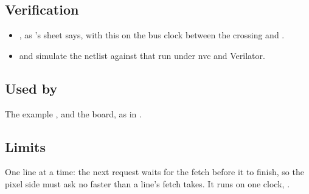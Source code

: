 \subsection*{Verification}

\begin{itemize}
\item {}, as 's sheet says, with this
on the bus clock between the crossing and .
\item {} and
 simulate the netlist
against that run under nvc and Verilator.
\end{itemize}

\subsection*{Used by}

The example , and the board, as  in .

\subsection*{Limits}

One line at a time: the next request waits for the fetch before it to
finish, so the pixel side must ask no faster than a line's fetch takes.
It runs on one clock, .
